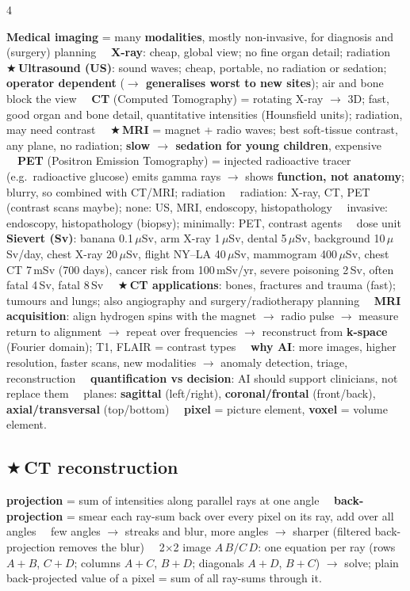 \documentclass[a4paper]{article}
\renewcommand{\section}[1]{\par\vspace{2.5pt}\noindent{\setlength{\fboxsep}{1pt}\colorbox{black}{\parbox{\dimexpr\linewidth-2\fboxsep}{\color{white}\bfseries\strut#1}}}\par\vspace{1pt}}
\newcommand{\K}[1]{\textcolor{kg}{\textbf{#1}}}
\newcommand{\E}[1]{\textcolor{ep}{#1}}
\newcommand{\T}[1]{\textcolor{tr}{\textbf{#1}}}
\newcommand{\X}{\textcolor{tr}{$\bigstar$}\,}
\newcommand{\D}{\unskip\ \textbf{\textbullet}\ \ignorespaces}
\newcommand{\ra}{\ensuremath{\to}}
\begin{document}
\fontsize{8.8}{9.85}\selectfont\RaggedRight
\begin{multicols*}{4}

\section{L1 Intro: modalities}
\K{Medical imaging} = many \K{modalities}, mostly non-invasive, for diagnosis and (surgery) planning \D \K{X-ray}: cheap, global view; no fine organ detail; radiation \D \X\K{Ultrasound (US)}: sound waves; cheap, portable, no radiation or sedation; \T{operator dependent} (\T{\ra{} generalises worst to new sites}); air and bone block the view \D \K{CT} (Computed Tomography) = rotating X-ray \ra{} 3D; fast, good organ and bone detail, quantitative intensities (Hounsfield units); radiation, may need contrast \D \X\K{MRI} = magnet + radio waves; best soft-tissue contrast, any plane, no radiation; \T{slow \ra{} sedation for young children}, expensive \D \K{PET} (Positron Emission Tomography) = injected radioactive tracer (e.g.\ radioactive glucose) emits gamma rays \ra{} shows \K{function, not anatomy}; blurry, so combined with CT/MRI; radiation \D radiation: X-ray, CT, PET (contrast scans maybe); none: US, MRI, endoscopy, histopathology \D invasive: endoscopy, histopathology (biopsy); minimally: PET, contrast agents \D dose unit \K{Sievert (Sv)}: \E{banana 0.1\,$\mu$Sv, arm X-ray 1\,$\mu$Sv, dental 5\,$\mu$Sv, background 10\,$\mu$Sv/day, chest X-ray 20\,$\mu$Sv, flight NY--LA 40\,$\mu$Sv, mammogram 400\,$\mu$Sv, chest CT 7\,mSv (700 days), cancer risk from 100\,mSv/yr, severe poisoning 2\,Sv, often fatal 4\,Sv, fatal 8\,Sv} \D \X\K{CT applications}: bones, fractures and trauma (fast); tumours and lungs; also angiography and surgery/radiotherapy planning \D \K{MRI acquisition}: align hydrogen spins with the magnet \ra{} radio pulse \ra{} measure return to alignment \ra{} repeat over frequencies \ra{} reconstruct from \K{k-space} (Fourier domain); T1, FLAIR = contrast types \D \K{why AI}: more images, higher resolution, faster scans, new modalities \ra{} anomaly detection, triage, reconstruction \D \K{quantification vs decision}: AI should support clinicians, not replace them \D planes: \K{sagittal} (left/right), \K{coronal/frontal} (front/back), \K{axial/transversal} (top/bottom) \D \K{pixel} = picture element, \K{voxel} = volume element.

\subsection{\X CT reconstruction}
\K{projection} = sum of intensities along parallel rays at one angle \D \K{back-projection} = smear each ray-sum back over every pixel on its ray, add over all angles \D few angles \ra{} streaks and blur, more angles \ra{} sharper (filtered back-projection removes the blur) \D \E{2$\times$2 image $A\,B/C\,D$: one equation per ray (rows $A{+}B$, $C{+}D$; columns $A{+}C$, $B{+}D$; diagonals $A{+}D$, $B{+}C$) \ra{} solve; plain back-projected value of a pixel = sum of all ray-sums through it}.


\end{multicols*}
\end{document}
